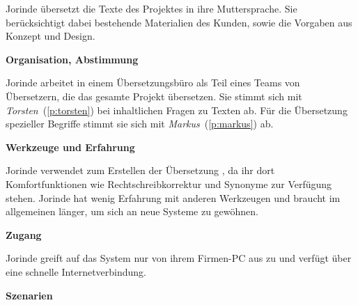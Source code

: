\begin{multicols}{2}

\begin{center}
\end{center}


Jorinde übersetzt die Texte des Projektes in ihre Muttersprache. Sie berücksichtigt dabei bestehende Materialien des Kunden, sowie die Vorgaben aus Konzept und Design.

\textbf{Organisation, Abstimmung}

Jorinde arbeitet in einem Übersetzungsbüro als Teil eines Teams von Übersetzern, die das gesamte Projekt übersetzen. Sie stimmt sich mit \emph{Torsten}~(\ref{p:torsten}) bei inhaltlichen Fragen zu Texten ab. Für die Übersetzung spezieller Begriffe stimmt sie sich mit \emph{Markus}~(\ref{p:markus}) ab.

\textbf{Werkzeuge und Erfahrung}

Jorinde verwendet zum Erstellen der Übersetzung , da ihr dort Komfortfunktionen wie Rechtschreibkorrektur und Synonyme zur Verfügung stehen.  Jorinde hat wenig Erfahrung mit anderen Werkzeugen und braucht im allgemeinen länger, um sich an neue Systeme zu gewöhnen.

\textbf{Zugang}

Jorinde greift auf das System nur von ihrem Firmen-PC aus zu und verfügt über eine schnelle Internetverbindung.

\columnbreak

\textbf{Szenarien}


\end{multicols}
